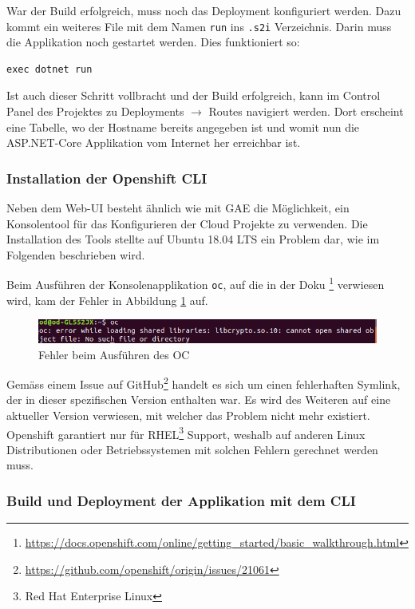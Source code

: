 \documentclass[12pt,a4paper]{article}
\begin{document}
War der Build erfolgreich, muss noch das Deployment konfiguriert werden. Dazu kommt ein weiteres File mit dem Namen \texttt{run} ins \texttt{.s2i} Verzeichnis. Darin muss die Applikation noch gestartet werden. Dies funktioniert so:
\begin{lstlisting}
exec dotnet run
\end{lstlisting}
Ist auch dieser Schritt vollbracht und der Build erfolgreich, kann im Control Panel des Projektes zu Deployments $\rightarrow$ Routes navigiert werden. Dort erscheint eine Tabelle, wo der Hostname bereits angegeben ist und womit nun die ASP.NET-Core Applikation vom Internet her erreichbar ist.



\subsubsection{Installation der Openshift CLI}
Neben dem Web-UI besteht ähnlich wie mit GAE die Möglichkeit, ein Konsolentool für das Konfigurieren der Cloud Projekte zu verwenden. Die Installation des Tools stellte auf Ubuntu 18.04 LTS ein Problem dar, wie im Folgenden beschrieben wird. 

Beim Ausführen der Konsolenapplikation \texttt{oc}, auf die in der Doku \footnote{\url{https://docs.openshift.com/online/getting_started/basic_walkthrough.html}} verwiesen wird, kam der Fehler in Abbildung \ref{fig:oc-error} auf.

\begin{figure}[h]
	\centering
	\includegraphics[width=1\linewidth]{img/oc-error}
	\caption{Fehler beim Ausführen des OC}
	\label{fig:oc-error}
\end{figure}

Gemäss einem Issue auf GitHub\footnote{\url{https://github.com/openshift/origin/issues/21061}} handelt es sich um einen fehlerhaften Symlink, der in dieser spezifischen Version enthalten war. Es wird des Weiteren auf eine aktueller Version verwiesen, mit welcher das Problem nicht mehr existiert. Openshift garantiert nur für RHEL\footnote{Red Hat Enterprise Linux} Support, weshalb auf anderen Linux Distributionen oder Betriebssystemen mit solchen Fehlern gerechnet werden muss.


\subsubsection{Build und Deployment der Applikation mit dem CLI}
\end{document}
